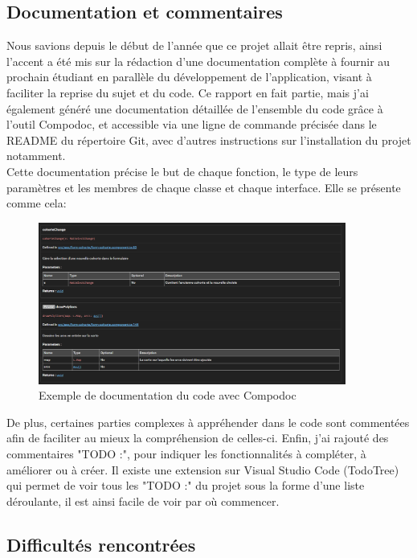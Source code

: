 \documentclass{polytech/polytech}
\numberwithin{figure}{chapter}
\begin{document}
\subsection{Documentation et commentaires}

Nous savions depuis le début de l'année que ce projet allait être repris, ainsi l'accent a été mis sur la rédaction d'une documentation complète à fournir au prochain étudiant en parallèle du développement de l'application, visant à faciliter la reprise du sujet et du code. Ce rapport en fait partie, mais j'ai également généré une documentation détaillée de l'ensemble du code grâce à l'outil Compodoc, et accessible via une ligne de commande précisée dans le README du répertoire Git, avec d'autres instructions sur l'installation du projet notamment.\\

Cette documentation précise le but de chaque fonction, le type de leurs paramètres et les membres de chaque classe et chaque interface. Elle se présente comme cela:

\begin{figure}[h]
    \centering
    \includegraphics[width=0.9\textwidth]{pic/compodoc.png}
    \caption{Exemple de documentation du code avec Compodoc}
\end{figure}

De plus, certaines parties complexes à appréhender dans le code sont commentées afin de faciliter au mieux la compréhension de celles-ci.
Enfin, j'ai rajouté des commentaires "TODO :", pour indiquer les fonctionnalités à compléter, à améliorer ou à créer. Il existe une extension sur Visual Studio Code (TodoTree) qui permet de voir tous les "TODO :" du projet sous la forme d'une liste déroulante, il est ainsi facile de voir par où commencer.

\subsection{Difficultés rencontrées}
\end{document}

